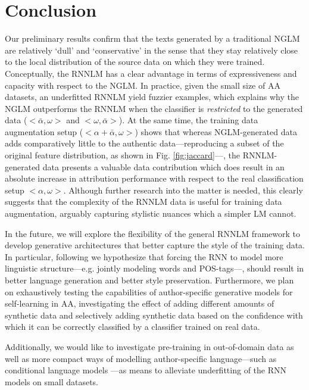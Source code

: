 \documentclass[11pt]{article}
\begin{document}
\section{Conclusion}
Our preliminary results confirm that the texts generated by a traditional NGLM are
relatively `dull' and `conservative' in the sense that they stay relatively close
to the local distribution of the source data on which they were trained. Conceptually, the RNNLM has a clear advantage in terms of expressiveness and capacity with respect to the NGLM. In practice, given the small size of AA datasets, an underfitted RNNLM yield fuzzier examples, which explains why the NGLM outperforms the RNNLM when the classifier is \emph{restricted} to the generated data ($<\bar{\alpha},\omega>$ and $<\omega,\bar{\alpha}>$). At the same time, the training data augmentation setup ($<\alpha + \bar{\alpha},\omega>$) shows that whereas NGLM-generated data adds comparatively little to the authentic data---reproducing a subset of the original feature distribution, as shown in Fig. \ref{fig:jaccard}---, the RNNLM-generated data presents a valuable data contribution which does result in an absolute increase in attribution performance with respect to the real classification setup $<\alpha, \omega>$. Although further research into the matter is needed, this clearly suggests that the complexity of the RNNLM data is useful for training data augmentation, arguably capturing stylistic nuances which a simpler LM cannot.

In the future, we will explore the flexibility of the general RNNLM  framework to develop generative architectures that better capture the style of the training data. In particular, following \cite{Linzen2016} we hypothesize that forcing the RNN to model more linguistic structure---e.g. jointly modeling words and POS-tags---, should result in better language generation and better style preservation. Furthermore, we plan on exhaustively testing the capabilities of author-specific generative models for self-learning in AA, investigating the effect of adding different amounts of synthetic data and selectively adding synthetic data based on the confidence with which it can be correctly classified by a classifier trained on real data.

Additionally, we would like to investigate pre-training in out-of-domain data as well as more compact ways of modelling author-specific language---such as conditional language models \cite{Tang2016}---as means to alleviate underfitting of the RNN models on small datasets.
\end{document}
